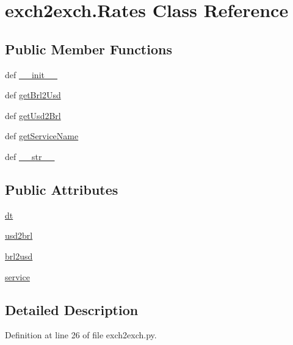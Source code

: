 \hypertarget{classexch2exch_1_1_rates}{\section{exch2exch.\-Rates Class Reference}
\label{classexch2exch_1_1_rates}
}
\subsection*{Public Member Functions}
\begin{DoxyCompactItemize}
\item 
def \hyperlink{classexch2exch_1_1_rates_adf2f5038d3b15e4b434ae3d32527ebe2}{\-\_\-\-\_\-init\-\_\-\-\_\-}
\item 
def \hyperlink{classexch2exch_1_1_rates_ae5e570daf9d176e3455bc98fc19e2b2c}{get\-Brl2\-Usd}
\item 
def \hyperlink{classexch2exch_1_1_rates_a1b3705806d2321660c4c2753474f403d}{get\-Usd2\-Brl}
\item 
def \hyperlink{classexch2exch_1_1_rates_a8ec48a9ebb71f923056205ad79679eeb}{get\-Service\-Name}
\item 
def \hyperlink{classexch2exch_1_1_rates_ac50b5d57f05657995ea0152bc4f195e9}{\-\_\-\-\_\-str\-\_\-\-\_\-}
\end{DoxyCompactItemize}
\subsection*{Public Attributes}
\begin{DoxyCompactItemize}
\item 
\hyperlink{classexch2exch_1_1_rates_acb12f83bce4393714ec30351a1d636c2}{dt}
\item 
\hyperlink{classexch2exch_1_1_rates_ab79ad6e4a42ca358e6b39c825a4b8a0b}{usd2brl}
\item 
\hyperlink{classexch2exch_1_1_rates_acc018dea09e825e18e91c73c5c63ab78}{brl2usd}
\item 
\hyperlink{classexch2exch_1_1_rates_a94c1394b9259d6a7c8f3c12bbd20e685}{service}
\end{DoxyCompactItemize}


\subsection{Detailed Description}


Definition at line 26 of file exch2exch.\-py.



